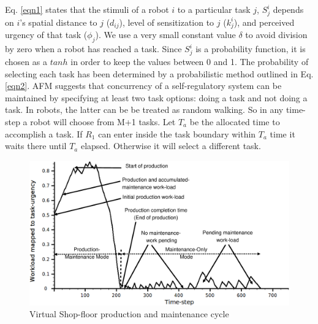 \documentclass{llncs}
\begin{document}
Eq. \ref{eqn1} states that the stimuli of a robot $i$ to a particular task $j$, $S_{j}^{i}$ depends on $i$'s spatial distance to $j$ ($d_{ij}$), level of sensitization to $j$ ($k_{j}^{i}$), and perceived urgency of that task ($\phi _{j}$). We use a very small constant value $\delta$ to avoid division by zero when a robot has reached a task. Since $S_{j}^{i}$ is a probability function, it is chosen as a $tanh$ in order
to keep the values between 0 and 1. The probability of selecting each task has been determined by a probabilistic method outlined in Eq. \ref{eqn2}.
AFM suggests that concurrency of a self-regulatory system can be maintained by specifying at least two task options: doing a task and not doing a task. In robots, the latter can be be treated as random walking. So in any time-step a robot will choose from M+1 tasks. Let $T_a$ be the allocated time to accomplish a task. If $R_1$ can enter inside the task boundary within $T_a$ time it waits there until $T_a$ elapsed. Otherwise it will select a different task.
\begin{figure}
\centering
\includegraphics[width=12cm, angle=0]
{./images/VSP.eps}
\caption{\small Virtual Shop-floor production and maintenance cycle}
\label{fig:vsp}  %
\end{figure}
\end{document}
